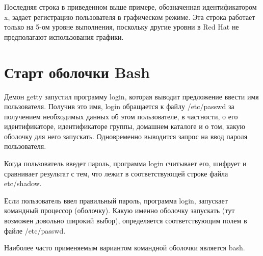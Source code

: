 Последняя строка в приведенном выше примере, обозначенная идентификатором x, задает регистрацию пользователя в графическом режиме. Эта строка работает только на 5-ом уровне выполнения, поскольку другие уровни в Red Hat не предполагают использования графики.

\newpage
\section{Старт оболочки Bash}

Демон getty запустил программу login, которая выводит предложение ввести имя пользователя. Получив это имя, login обращается к файлу /etc/passwd за получением необходимых данных об этом пользователе, в частности, о его идентификаторе, идентификаторе группы, домашнем каталоге и о том, какую оболочку для него запускать. Одновременно выводится запрос на ввод пароля пользователя.

Когда пользователь введет пароль, программа login считывает его, шифрует и сравнивает результат с тем, что лежит в соответствующей строке файла etc/shadow.

Если пользователь ввел правильный пароль, программа login, запускает командный процессор (оболочку). Какую именно оболочку запускать (тут возможен довольно широкий выбор), определяется соответствующим полем в файле /etc/passwd.

Наиболее часто применяемым вариантом командной оболочки является bash.